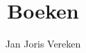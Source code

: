 \documentclass[dutch,twocolumn]{article}
\title{Boeken}
\author{Jan Joris Vere\ij{}ken}
\begin{document}
   \maketitle
   \nocite{*}
   
   \renewcommand{\refname}{\vskip-2.65ex}
   \footnotesize
   
\end{document}

